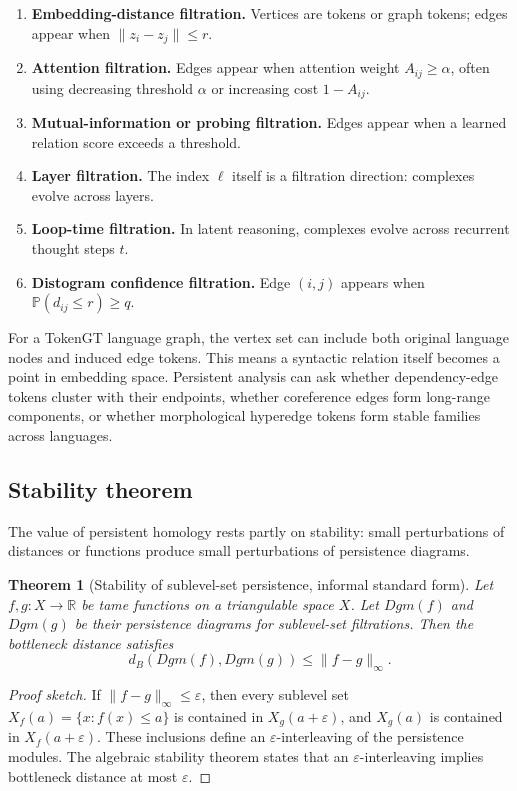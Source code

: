 \documentclass[11pt]{article}
\newtheorem{theorem}[definition]{Theorem}
\newcommand{\R}{\mathbb{R}}
\newcommand{\1}{\mathbf{1}}
\newcommand{\eps}{\varepsilon}
\begin{document}
\begin{enumerate}
\item \textbf{Embedding-distance filtration.} Vertices are tokens or graph tokens; edges appear when $\|z_i-z_j\|\le r$.
\item \textbf{Attention filtration.} Edges appear when attention weight $A_{ij}\ge \alpha$, often using decreasing threshold $\alpha$ or increasing cost $1-A_{ij}$.
\item \textbf{Mutual-information or probing filtration.} Edges appear when a learned relation score exceeds a threshold.
\item \textbf{Layer filtration.} The index $\ell$ itself is a filtration direction: complexes evolve across layers.
\item \textbf{Loop-time filtration.} In latent reasoning, complexes evolve across recurrent thought steps $t$.
\item \textbf{Distogram confidence filtration.} Edge $(i,j)$ appears when $\mathbb{P}(d_{ij}\le r)\ge q$.
\end{enumerate}

For a TokenGT language graph, the vertex set can include both original language nodes and induced edge tokens. This means a syntactic relation itself becomes a point in embedding space. Persistent analysis can ask whether dependency-edge tokens cluster with their endpoints, whether coreference edges form long-range components, or whether morphological hyperedge tokens form stable families across languages.

\subsection{Stability theorem}

The value of persistent homology rests partly on stability: small perturbations of distances or functions produce small perturbations of persistence diagrams.

\begin{theorem}[Stability of sublevel-set persistence, informal standard form]
Let $f,g:X\to\R$ be tame functions on a triangulable space $X$. Let $Dgm(f)$ and $Dgm(g)$ be their persistence diagrams for sublevel-set filtrations. Then the bottleneck distance satisfies
\[
d_B(Dgm(f),Dgm(g))\le \|f-g\|_\infty.
\]
\end{theorem}
\begin{proof}[Proof sketch]
If $\|f-g\|_\infty\le\eps$, then every sublevel set $X_f(a)=\{x:f(x)\le a\}$ is contained in $X_g(a+\eps)$, and $X_g(a)$ is contained in $X_f(a+\eps)$. These inclusions define an $\eps$-interleaving of the persistence modules. The algebraic stability theorem states that an $\eps$-interleaving implies bottleneck distance at most $\eps$.
\end{proof}
\end{document}
